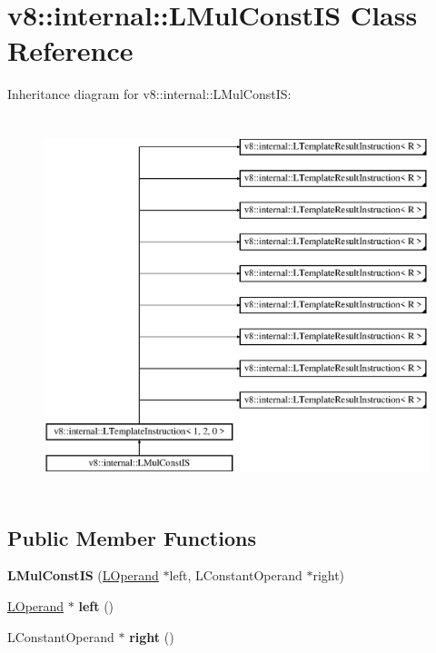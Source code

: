 \hypertarget{classv8_1_1internal_1_1_l_mul_const_i_s}{}\section{v8\+:\+:internal\+:\+:L\+Mul\+Const\+IS Class Reference}
\label{classv8_1_1internal_1_1_l_mul_const_i_s}
Inheritance diagram for v8\+:\+:internal\+:\+:L\+Mul\+Const\+IS\+:\begin{figure}[H]
\begin{center}
\leavevmode
\includegraphics[height=11.000000cm]{classv8_1_1internal_1_1_l_mul_const_i_s}
\end{center}
\end{figure}
\subsection*{Public Member Functions}
\begin{DoxyCompactItemize}
\item 
{\bfseries L\+Mul\+Const\+IS} (\hyperlink{classv8_1_1internal_1_1_l_operand}{L\+Operand} $\ast$left, L\+Constant\+Operand $\ast$right)\hypertarget{classv8_1_1internal_1_1_l_mul_const_i_s_a05a79c8c371ec30528e718d592ff02c3}{}\label{classv8_1_1internal_1_1_l_mul_const_i_s_a05a79c8c371ec30528e718d592ff02c3}

\item 
\hyperlink{classv8_1_1internal_1_1_l_operand}{L\+Operand} $\ast$ {\bfseries left} ()\hypertarget{classv8_1_1internal_1_1_l_mul_const_i_s_af8a6a28496da75b2be8e6ed37d3cba40}{}\label{classv8_1_1internal_1_1_l_mul_const_i_s_af8a6a28496da75b2be8e6ed37d3cba40}

\item 
L\+Constant\+Operand $\ast$ {\bfseries right} ()\hypertarget{classv8_1_1internal_1_1_l_mul_const_i_s_a28771e7093024cbc992e2e0c800c0a53}{}\label{classv8_1_1internal_1_1_l_mul_const_i_s_a28771e7093024cbc992e2e0c800c0a53}

\end{DoxyCompactItemize}
